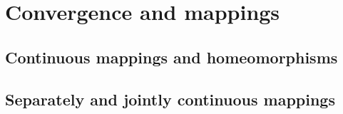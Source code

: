 \chapter{Convergence and mappings}

\section{Continuous mappings and homeomorphisms}

\section{Separately and jointly continuous mappings}